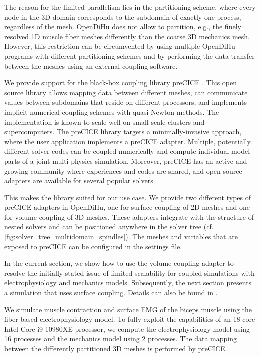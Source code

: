 The reason for the limited parallelism lies in the partitioning scheme, where every node in the 3D domain corresponds to the subdomain of exactly one process, regardless of the mesh. OpenDiHu does not allow to partition, e.g., the finely resolved 1D muscle fiber meshes differently than the coarse 3D mechanics mesh. However, this restriction can be circumvented by using multiple OpenDiHu programs with different partitioning schemes and by performing the data transfer between the meshes using an external coupling software.

We provide support for the black-box coupling library preCICE \cite{precice}. This open source library allows mapping data between different meshes, can communicate values between subdomains that reside on different processors, and implements implicit numerical coupling schemes with quasi-Newton methods. The implementation is known to scale well on small-scale clusters and supercomputers.
The preCICE library targets a minimally-invasive approach, where the user application implements a preCICE adapter. Multiple, potentially different solver codes can be coupled numerically and compute individual model parts of a joint multi-physics simulation. Moreover, preCICE has an active and growing community where experiences and codes are shared, and open source adapters are available for several popular solvers.

This makes the library suited for our use case. We provide two different types of preCICE adapters in OpenDiHu, one for surface coupling of 2D meshes and one for volume coupling of 3D meshes. These adapters integrate with the structure of nested solvers and can be positioned anywhere in the solver tree (cf. \cref{fig:solver_tree_multidomain_spindles}). The meshes and variables that are exposed to preCICE can be configured in the settings file.

In the current section, we show how to use the volume coupling adapter to resolve the initially stated issue of limited scalability for coupled simulations with electrophysiology and mechanics models. Subsequently, the next section presents a simulation that uses surface coupling. Details can also be found in \cite{hlrs2021}.

We simulate muscle contraction and surface EMG of the biceps muscle using the fiber based electrophysiology model. To fully exploit the  capabilities of an 18-core Intel Core i9-10980XE processor, we compute the electrophysiology model using 16 processes and the mechanics model using 2 processes. The data mapping between the differently partitioned 3D meshes is performed by preCICE.

